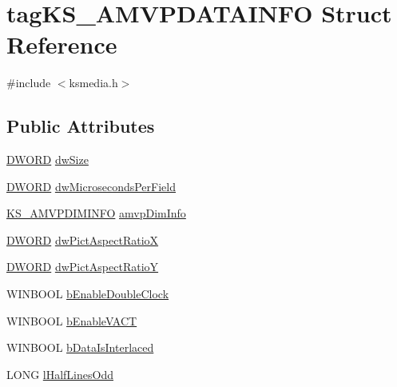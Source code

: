 \hypertarget{structtag_k_s___a_m_v_p_d_a_t_a_i_n_f_o}{}\section{tag\+K\+S\+\_\+\+A\+M\+V\+P\+D\+A\+T\+A\+I\+N\+FO Struct Reference}
\label{structtag_k_s___a_m_v_p_d_a_t_a_i_n_f_o}


{\ttfamily \#include $<$ksmedia.\+h$>$}

\subsection*{Public Attributes}
\begin{DoxyCompactItemize}
\item 
\hyperlink{mapinls_8h_ad342ac907eb044443153a22f964bf0af}{D\+W\+O\+RD} \hyperlink{structtag_k_s___a_m_v_p_d_a_t_a_i_n_f_o_ab03c1719632f1a34ccc44cb01e24d22d}{dw\+Size}
\item 
\hyperlink{mapinls_8h_ad342ac907eb044443153a22f964bf0af}{D\+W\+O\+RD} \hyperlink{structtag_k_s___a_m_v_p_d_a_t_a_i_n_f_o_aa2937b9af3450bfcf7b33aa64c92f154}{dw\+Microseconds\+Per\+Field}
\item 
\hyperlink{ksmedia_8h_af4ecd87e6a3d85afcb373487d3871f70}{K\+S\+\_\+\+A\+M\+V\+P\+D\+I\+M\+I\+N\+FO} \hyperlink{structtag_k_s___a_m_v_p_d_a_t_a_i_n_f_o_ac9951504f8a11f5299fa6db837d5c43c}{amvp\+Dim\+Info}
\item 
\hyperlink{mapinls_8h_ad342ac907eb044443153a22f964bf0af}{D\+W\+O\+RD} \hyperlink{structtag_k_s___a_m_v_p_d_a_t_a_i_n_f_o_aabcb44f2d7d87701ba48959f72ee0de3}{dw\+Pict\+Aspect\+RatioX}
\item 
\hyperlink{mapinls_8h_ad342ac907eb044443153a22f964bf0af}{D\+W\+O\+RD} \hyperlink{structtag_k_s___a_m_v_p_d_a_t_a_i_n_f_o_ae5dc41bdfab5e344a7971275f1d8a5c6}{dw\+Pict\+Aspect\+RatioY}
\item 
W\+I\+N\+B\+O\+OL \hyperlink{structtag_k_s___a_m_v_p_d_a_t_a_i_n_f_o_ac5243cc840bdf1976fbb7c57a9624d51}{b\+Enable\+Double\+Clock}
\item 
W\+I\+N\+B\+O\+OL \hyperlink{structtag_k_s___a_m_v_p_d_a_t_a_i_n_f_o_a6f33fbcc7e324444f6dbb54d7dea8ef5}{b\+Enable\+V\+A\+CT}
\item 
W\+I\+N\+B\+O\+OL \hyperlink{structtag_k_s___a_m_v_p_d_a_t_a_i_n_f_o_ab5968a0c879a0293eb03d9de3c24ff73}{b\+Data\+Is\+Interlaced}
\item 
L\+O\+NG \hyperlink{structtag_k_s___a_m_v_p_d_a_t_a_i_n_f_o_a11992f0b3c4c7d195a47e36237d986de}{l\+Half\+Lines\+Odd}

\end{DoxyCompactItemize}
